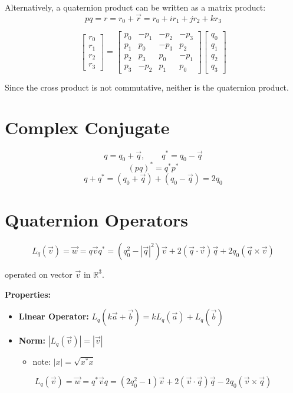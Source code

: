 \documentclass[11pt]{article}
\newcommand{\vect}[1]{\vec{#1}}
\begin{document}
Alternatively, a quaternion product can be written as a matrix product:
\[
pq = r = r_0 + \vect{r} = r_0 + i r_1 + j r_2 + k r_3
\]

\[
\begin{bmatrix} r_0 \\ r_1 \\ r_2 \\ r_3 \end{bmatrix}
=
\begin{bmatrix}
p_0 & -p_1 & -p_2 & -p_3 \\
p_1 & p_0 & -p_3 & p_2 \\
p_2 & p_3 & p_0 & -p_1 \\
p_3 & -p_2 & p_1 & p_0
\end{bmatrix}
\begin{bmatrix} q_0 \\ q_1 \\ q_2 \\ q_3 \end{bmatrix}
\]

Since the cross product is not commutative, neither is the quaternion product.

\section*{Complex Conjugate}

\[
q = q_0 + \vect{q}, \qquad q^* = q_0 - \vect{q}
\]
\[
(pq)^* = q^* p^*
\]
\[
q + q^* = (q_0 + \vect{q}) + (q_0 - \vect{q}) = 2q_0
\]

\section*{Quaternion Operators}

\[
L_q(\vect{v}) = \vect{w} = q\vect{v}q^*
 = (q_0^2 - |\vect{q}|^2)\vect{v} + 2(\vect{q}\cdot\vect{v})\vect{q} + 2q_0(\vect{q}\times\vect{v})
\]

operated on vector $\vect{v}$ in $\mathbb{R}^3$.

\textbf{Properties:}
\begin{itemize}
    \item \textbf{Linear Operator:} $L_q(k\vect{a} + \vect{b}) = k L_q(\vect{a}) + L_q(\vect{b})$
    \item \textbf{Norm:} $|L_q(\vect{v})| = |\vect{v}|$
    \begin{itemize}
        \item[$\hookrightarrow$] note: $|x| = \sqrt{x^*x}$
    \end{itemize}
\end{itemize}

\[
L_q(\vect{v}) = \vect{w} = q^*\vect{v}q = (2q_0^2 - 1)\vect{v} + 2(\vect{v}\cdot\vect{q})\vect{q} - 2q_0(\vect{v}\times\vect{q})
\]
\end{document}
